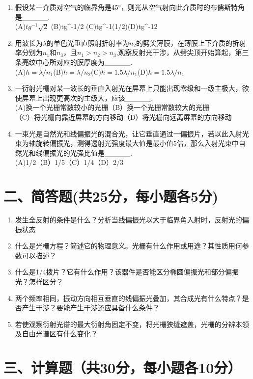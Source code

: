 \documentclass[12pt, a4paper]{article}
\theoremstyle{solution}
\begin{document}
\begin{enumerate}
    \item 假设某一介质对空气的临界角是45°，则光从空气射向此介质时的布儒斯特角是\_\_\_\_\_.\\(A)\(tg^{-1}\sqrt{2}\) \qquad(B)tg^{-1}/2 \qquad(C)tg^{-1}(1/2)\qquad(D)tg^{-1}2
    \item 用波长为\(\lambda\)的单色光垂直照射折射率为\(n_2\)的劈尖薄膜，在薄膜上下介质的折射率分别为\(n_1\)和\(n_3\)，且\(n_1>n_2>n_3\),观察反射光干涉，从劈尖顶开始算起，第三条亮纹中心所对应的膜厚度为\_\_\_\_\_.\\(A)\(h=\lambda/n_1\)\qquad(B)\(h=\lambda/n_2\)\qquad(C)\(h=1.5\lambda/n_1\)\qquad(D)\(h=1.5\lambda/n_1\)
    \item 一衍射光栅对某一波长的垂直入射光在屏幕上只能出现零级和一级主极大，欲使屏幕上出现更高次的主级大，应该\_\_\_\_\_.\\(A)换一个光栅常数较小的光栅\qquad（B）换一个光栅常数较大的光栅\\（C）将光栅向靠近屏幕的方向移动\qquad（D）将光栅向远离屏幕的方向移动
    \item 一束光是自然光和线偏振光的混合光，让它垂直通过一偏振片，若以此入射光束为轴旋转偏振光，测得透射光强度最大值是最小值5倍，那么入射光束中自然光和线偏振光的光强比值是\_\_\_\_\_.\\(A)1/2\qquad（B）1/5\qquad（C）1/4\qquad（D）2/3
\end{enumerate}



\section*{二、简答题(共25分，每小题各5分)}
\begin{enumerate}
    \item 发生全反射的条件是什么？分析当线偏振光以大于临界角入射时，反射光的偏振状态
    \item 什么是光栅方程？简述它的物理意义。光栅有什么作用或用途？其性质用何参数可以描述？
    \item 什么是1/4拨片？它有什么作用？该器件是否能区分椭圆偏振光和部分偏振光？怎样区分？
    \item 两个频率相同，振动方向相互垂直的线偏振光叠加，其合成光有什么特点？是否产生干涉？要能产生干涉还应具备什么条件？
    \item 若使观察衍射光谱的最大衍射角固定不变，将光栅狭缝遮盖，光栅的分辨本领及自由光谱区有什么变化？
\end{enumerate}

\section*{三、计算题（共30分，每小题各10分）}
\end{document}
